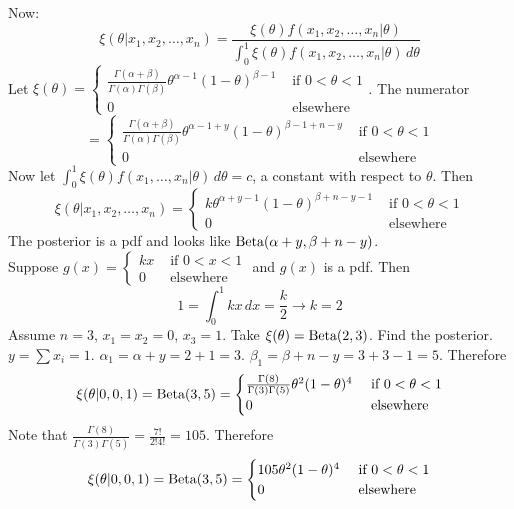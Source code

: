 \documentclass[12pt]{article}
\begin{document}
Now: $$ \xi(\theta|x_1,x_2,\dots,x_n) = \frac{\xi(\theta)f(x_1,x_2,\dots,x_n|\theta)}{\int_0^1 \xi(\theta)f(x_1,x_2,\dots,x_n|\theta)\,d\theta}$$ Let $\xi(\theta) = \begin{cases} \frac{\Gamma(\alpha + \beta)}{\Gamma(\alpha)\Gamma(\beta)} \theta^{\alpha - 1}(1-\theta)^{\beta - 1} &\text{ if } 0 < \theta < 1 \\ 0 &\text{ elsewhere} \end{cases}$. The numerator $$ = \begin{cases} \frac{\Gamma(\alpha + \beta)}{\Gamma(\alpha)\Gamma(\beta)} \theta^{\alpha - 1 + y} (1-\theta)^{\beta - 1 + n - y} &\text{ if } 0 < \theta < 1 \\ 0 &\text{ elsewhere } \end{cases} $$ Now let $\int_0^1 \xi(\theta)f(x_1,\dots, x_n|\theta) \, d\theta = c$, a constant with respect to $\theta$. Then 
$$ \xi(\theta|x_1,x_2,\dots,x_n) = \begin{cases} k \theta^{\alpha + y - 1} (1-\theta)^{\beta + n - y - 1} &\text{ if } 0 < \theta < 1 \\ 0 &\text{ elsewhere} \end{cases} $$ 
The posterior is a pdf and looks like $\text{Beta}( \alpha+y,\beta+n-y )$. \\
Suppose $g(x) = \begin{cases} kx &\text{ if } 0 < x < 1 \\ 0 &\text{ elsewhere} \end{cases} $ and $g(x)$ is a pdf. Then $$1 = \int_0^1 kx \,dx = \frac{k}{2} \to k = 2$$ 
Assume $n= 3$, $x_1 = x_2 = 0$, $x_3 = 1$. Take $\xi(\theta) = \text{Beta}( 2,3 )$. Find the posterior. $y = \sum x_i = 1$. $\alpha_1 = \alpha + y = 2 + 1 = 3$. $\beta_1 = \beta + n - y = 3 + 3 - 1 = 5$. Therefore $$ \xi(\theta|0,0,1) = \text{Beta}( 3,5 ) = \begin{cases} \frac{\Gamma(8)}{\Gamma(3)\Gamma(5)} \theta^2(1-\theta)^4 &\text{ if } 0 < \theta < 1 \\ 0 &\text{ elsewhere }\end{cases} $$ 
Note that $\frac{\Gamma(8)}{\Gamma(3)\Gamma(5)} = \frac{7!}{2!4!} = 105$. Therefore 
$$ \xi(\theta|0,0,1) = \text{Beta}( 3,5 ) = \begin{cases} 105\theta^2(1-\theta)^4 &\text{ if } 0 < \theta < 1 \\ 0 &\text{ elsewhere } \end{cases} $$ 
\end{document}
